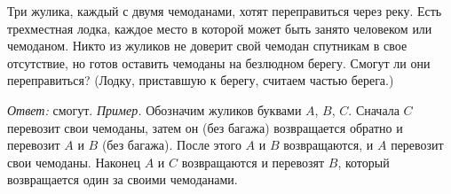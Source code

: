Три жулика, каждый с двумя чемоданами, хотят переправиться через реку.
Есть трехместная лодка, каждое место в которой может быть занято человеком или
чемоданом.
Никто из жуликов не доверит свой чемодан спутникам в свое отсутствие, но готов
оставить чемоданы на безлюдном берегу.
Смогут ли они переправиться?
(Лодку, приставшую к берегу, считаем частью берега.)

\solution
\emph{Ответ:} смогут.
\emph{Пример.}
Обозначим жуликов буквами $A$, $B$, $C$.
Сначала $C$ перевозит свои чемоданы, затем он (без багажа) возвращается обратно
и перевозит $A$ и $B$ (без багажа).
После этого $A$ и $B$ возвращаются, и $A$ перевозит свои чемоданы.
Наконец $A$ и $C$ возвращаются и перевозят $B$, который возвращается один за
своими чемоданами.

